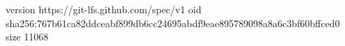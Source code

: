version https://git-lfs.github.com/spec/v1
oid sha256:767b61ca82ddceabf899db6cc24695abdf9eae895789098a8a6c3bf60bffced0
size 11068
